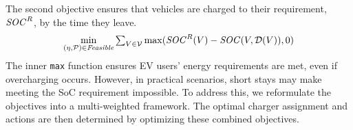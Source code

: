 The second objective ensures that vehicles are charged to their requirement, ${{\it SOC}^{R}}$, by the time they leave.
\begin{align}
\label{eq: soc_penalty}
\begin{split}
\min_{(\eta,\mathcal{P}) \in \textit{Feasible}} \textstyle\sum_{V \in \mathcal{V}} \max({{\it SOC}^{R}}(V) - {\it SOC}(V,\mathcal{D}(V)), 0)
\end{split}
\end{align}
The inner \texttt{max} function ensures EV users' energy requirements are met, even if overcharging occurs.
However, in practical scenarios, short stays may make meeting the SoC requirement impossible. To address this, we reformulate the objectives into a multi-weighted framework.
The optimal charger assignment and actions are then determined by optimizing these combined objectives.












